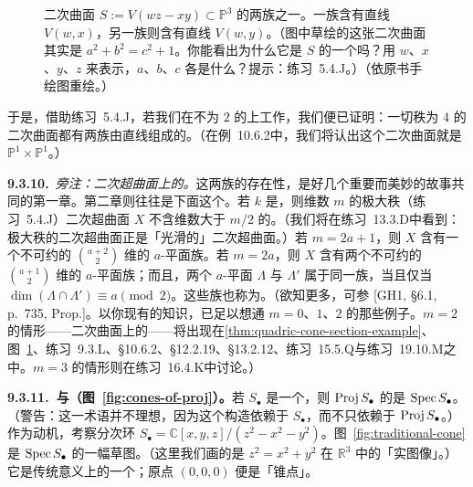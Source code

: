 \begin{figure}[htbp]
\centering
{}
\caption{二次曲面 $S:=V(wz-xy)\subset\mathbb{P}^3$ 的两族\trRuling{}之一。一族\trRuling{}含有直线 $V(w,x)$，另一族则含有直线 $V(w,y)$。（图中草绘的这张二次曲面其实是 $a^2+b^2=c^2+1$。你能看出为什么它是 $S$ 的一个\trAffine\trCoordinatePatch{}吗？用 $w$、$x$、$y$、$z$ 来表示，$a$、$b$、$c$ 各是什么？提示：\mbox{练习~5.4.J}。）（依原书手绘图重绘。）}\label{fig:ruling-quadric-surface}
\end{figure}

于是，借助\mbox{练习~5.4.J}，若我们在\trCharacteristic{}不为 $2$ 的\trAlgClosedField{}上工作，我们便已证明：一切秩为 $4$ 的二次曲面都有两族由直线组成的\trRuling。（在\mbox{例~10.6.2}中，我们将认出这个二次曲面就是 $\mathbb{P}^1\times\mathbb{P}^1$。）

\textbf{9.3.10.}\ \emph{旁注：二次超曲面上的\trRuling。}\quad 这两族\trRuling{}的存在性，是好几个重要而美妙的故事共同的第一章。第二章则往往是下面这个。若 $k$ 是\trAlgClosedField，则维数 $m$ 的极大秩（\mbox{练习~5.4.J}）二次超曲面 $X$ 不含维数大于 $m/2$ 的\trLinearSpace{}。（我们将在\mbox{练习~13.3.D}中看到：极大秩的二次超曲面正是「光滑的」二次超曲面。）若 $m=2a+1$，则 $X$ 含有一个不可约的 $\binom{a+2}{2}$ 维的 $a$-平面族。若 $m=2a$，则 $X$ 含有两个不可约的 $\binom{a+1}{2}$ 维的 $a$-平面族；而且，两个 $a$-平面 $\Lambda$ 与 $\Lambda'$ 属于同一族，当且仅当 $\dim(\Lambda\cap\Lambda')\equiv a\pmod 2$。这些\trLinearSpace{}族也称为\trRuling。（欲知更多，可参 [GH1, \S6.1, p.~735, Prop.]。以你现有的知识，已足以想通 $m=0$、$1$、$2$ 的那些例子。$m=2$ 的情形——二次曲面上的\trRuling——将出现在\cref{thm:quadric-cone-section-example}、图~\ref{fig:ruling-quadric-surface}、\mbox{练习~9.3.L}、\S10.6.2、\S12.2.19、\S13.2.12、\mbox{练习~15.5.Q}与\mbox{练习~19.10.M}之中。$m=3$ 的情形则在\mbox{练习~16.4.K}中讨论。）

\textbf{9.3.11.\ \trAffine\trCone{}与\trProjective\trCone{}（图~\ref{fig:cones-of-proj}）。}\quad 若 $S_\bullet$ 是一个\trFinitelyGenerated\trGradedRing，则 $\operatorname{Proj} S_\bullet$ 的\trAffine\trCone{}是 $\operatorname{Spec} S_\bullet$。（警告：这一术语并不理想，因为这个构造依赖于 $S_\bullet$，而不只依赖于 $\operatorname{Proj} S_\bullet$。）作为动机，考察分次环 $S_\bullet=\mathbb{C}[x,y,z]/(z^2-x^2-y^2)$。图~\ref{fig:traditional-cone}是 $\operatorname{Spec} S_\bullet$ 的一幅草图。（这里我们画的是 $z^2=x^2+y^2$ 在 $\mathbb{R}^3$ 中的「实图像」。）它是传统意义上的一个\trCone；原点 $(0,0,0)$ 便是「锥点」。

